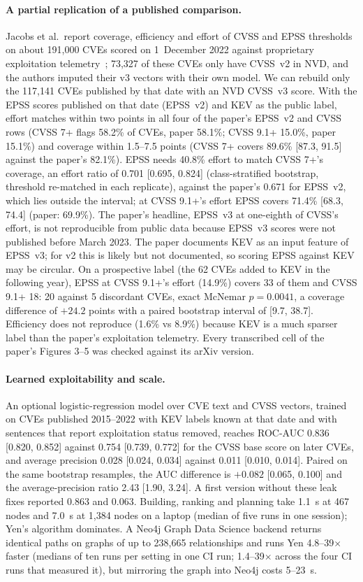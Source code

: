\documentclass[11pt]{article}
\begin{document}
\paragraph{A partial replication of a published comparison.} Jacobs et al.\ report coverage, efficiency and effort of
CVSS and EPSS thresholds on about 191,000 CVEs scored on 1~December 2022 against proprietary exploitation
telemetry~\cite{jacobs2023enhancing}; 73,327 of these CVEs only have CVSS~v2 in NVD, and the authors imputed their v3
vectors with their own model. We can rebuild only the 117,141 CVEs published by that date with an NVD CVSS~v3 score.
With the EPSS scores published on that date (EPSS~v2) and KEV as the public label, effort matches within two points in
all four of the paper's EPSS~v2 and CVSS rows (CVSS 7+ flags 58.2\% of CVEs, paper 58.1\%; CVSS 9.1+ 15.0\%, paper
15.1\%) and coverage within 1.5--7.5 points (CVSS 7+ covers 89.6\% [87.3, 91.5] against the paper's 82.1\%). EPSS
needs 40.8\% effort to match CVSS 7+'s coverage, an effort ratio of 0.701 [0.695, 0.824] (class-stratified bootstrap,
threshold re-matched in each replicate), against the paper's 0.671 for EPSS~v2, which lies outside the interval; at
CVSS 9.1+'s effort EPSS covers 71.4\% [68.3, 74.4] (paper: 69.9\%). The paper's headline, EPSS~v3 at one-eighth of
CVSS's effort, is not reproducible from public data because EPSS~v3 scores were not published before March 2023.
The paper documents KEV as an input feature of EPSS~v3; for v2 this is likely but not documented, so scoring EPSS
against KEV may be circular. On a prospective label (the 62 CVEs added to KEV in the following year), EPSS at CVSS
9.1+'s effort (14.9\%) covers 33 of them and CVSS 9.1+ 18: 20 against 5 discordant CVEs, exact McNemar $p = 0.0041$,
a coverage difference of $+24.2$ points with a paired bootstrap interval of [9.7, 38.7]. Efficiency does not
reproduce (1.6\% vs 8.9\%) because KEV is a much sparser label than the paper's exploitation telemetry. Every
transcribed cell of the paper's Figures 3--5 was checked against its arXiv version.

\paragraph{Learned exploitability and scale.} An optional logistic-regression model over CVE text and CVSS vectors,
trained on CVEs published 2015--2022 with KEV labels known at that date and with sentences that report exploitation
status removed, reaches ROC-AUC 0.836 [0.820, 0.852] against 0.754 [0.739, 0.772] for the CVSS base score on later
CVEs, and average precision 0.028 [0.024, 0.034] against 0.011 [0.010, 0.014]. Paired on the same bootstrap resamples,
the AUC difference is $+0.082$ [0.065, 0.100] and the average-precision ratio 2.43 [1.90, 3.24]. A first version
without these leak fixes reported 0.863 and 0.063. Building, ranking and planning take 1.1~s at 467 nodes and 7.0~s at
1,384 nodes on a laptop (median of five runs in one session); Yen's algorithm dominates. A Neo4j Graph Data Science
backend returns identical paths on graphs of up to 238,665 relationships and runs Yen 4.8--39$\times$ faster (medians of ten runs per setting in one CI run; 1.4--39$\times$ across
the four CI runs that measured it), but mirroring the graph into Neo4j costs 5--23~s.
\end{document}

